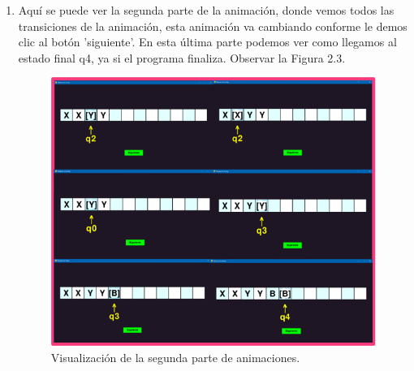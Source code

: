 \begin{enumerate}
\newpage
\item Aquí se puede ver la segunda parte de la animación, donde vemos todos las transiciones de la animación, esta animación va cambiando conforme le demos clic al botón 'siguiente'. En esta última parte podemos ver como llegamos al estado final q4, ya si el programa finaliza. Observar la Figura 2.3.
\begin{figure}[h]
    \begin{center}
    \includegraphics[width=0.8\linewidth]{Images/Cap2.png}
    \end{center}
\caption{Visualización de la segunda parte de animaciones.}
\label{fig:imagen}
\end{figure}


\end{enumerate}
